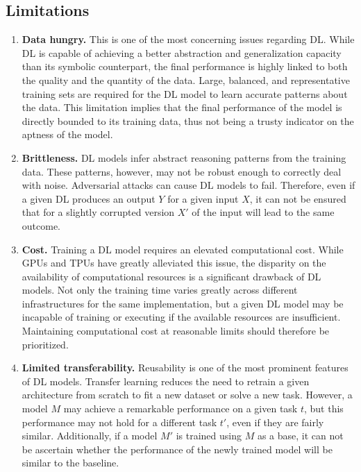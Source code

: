 \subsection{Limitations}
\begin{enumerate} [start=1,label={\bfseries L\arabic*.}]
    \item \label{kbsintrodl_L_data_hungry} \textbf{Data hungry.} This is one of the most concerning issues regarding DL. While DL is capable of achieving a better abstraction and generalization capacity than its symbolic counterpart, the final performance is highly linked to both the quality and the quantity of the data. Large, balanced, and representative training sets are required for the DL model to learn accurate patterns about the data. This limitation implies that the final performance of the model is directly bounded to its training data, thus not being a trusty indicator on the aptness of the model. 
    
    \item \label{kbsintrodl_L_brittleness} \textbf{Brittleness.} DL models infer abstract reasoning patterns from the training data. These patterns, however, may not be robust enough to correctly deal with noise. Adversarial attacks can cause DL models to fail. Therefore, even if a given DL produces an output $Y$ for a given input $X$, it can not be ensured that for a slightly corrupted version $X'$ of the input will lead to the same outcome.
    
    \item \label{kbsintrodl_L_cost} \textbf{Cost.} Training a DL model requires an elevated computational cost. While GPUs and TPUs have greatly alleviated this issue, the disparity on the availability of computational resources is a significant drawback of DL models. Not only the training time varies greatly across different infrastructures for the same implementation, but a given DL model may be incapable of training or executing if the available resources are insufficient. Maintaining computational cost at reasonable limits should therefore be prioritized.  
    
    \item \label{kbsintrodl_L_transfer} \textbf{Limited transferability.} Reusability is one of the most prominent features of DL models. Transfer learning reduces the need to retrain a given architecture from scratch to fit a new dataset or solve a new task. However, a model $M$ may achieve a remarkable performance on a given task $t$, but this performance may not  hold for a different task $t'$, even if they are fairly similar. Additionally, if a model $M'$ is trained using $M$ as a base, it can not be ascertain whether the performance of the newly trained model will be similar to the baseline.
    

\end{enumerate}
